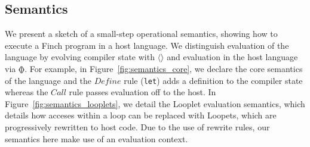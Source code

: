 



\subsection{Semantics}

We present a sketch of a small-step operational semantics, showing how to execute a Finch program in a host language.
%
We distinguish evaluation of the language by evolving compiler state with $\langle \rangle$ and evaluation in the host language via $\llangle\rrangle$.
%
For example, in Figure~\ref{fig:semantics_core}, we declare the core semantics of the language and the $Define$ rule (\texttt{let}) adds a definition to the compiler state whereas the $Call$ rule passes evaluation off to the host.
%
In Figure~\ref{fig:semantics_looplets}, we detail the Looplet evaluation semantics, which details how acceses within a loop can be replaced with Loopets, which are progressively rewritten to host code.
%
Due to the use of rewrite rules, our semantics here make use of an evaluation context.


